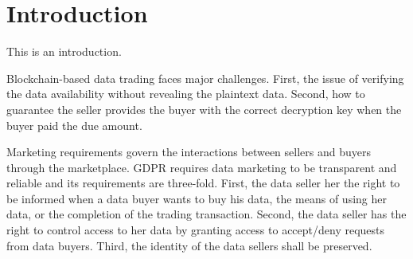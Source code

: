 \section{Introduction}
\label{sec:introduction}

This is an introduction.



Blockchain-based data trading faces major challenges.
First, the issue of verifying the data availability without revealing the plaintext data.
Second, how to guarantee the seller provides the buyer with the correct decryption key when the buyer paid the due amount.

Marketing requirements govern the interactions between sellers and buyers through the marketplace.
GDPR requires data marketing to be transparent and reliable and its requirements are three-fold.
First, the data seller her the right to be informed when a data buyer wants to buy his data, the means of using  her data, or the completion of the trading transaction.
Second, the data seller has the right to control access to her data by granting access to accept/deny requests from data buyers.
Third, the identity of the data sellers shall be preserved.

